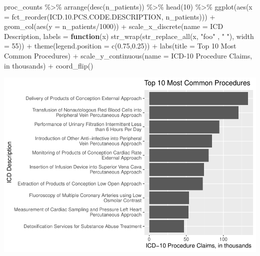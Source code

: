 \documentclass[preprint, 3p,
authoryear]{elsarticle} %
\newenvironment{Shaded}{\begin{snugshade}}{\end{snugshade}}
\newcommand{\AttributeTok}[1]{\textcolor[rgb]{0.77,0.63,0.00}{#1}}
\newcommand{\ControlFlowTok}[1]{\textcolor[rgb]{0.13,0.29,0.53}{\textbf{#1}}}
\newcommand{\DecValTok}[1]{\textcolor[rgb]{0.00,0.00,0.81}{#1}}
\newcommand{\FloatTok}[1]{\textcolor[rgb]{0.00,0.00,0.81}{#1}}
\newcommand{\FunctionTok}[1]{\textcolor[rgb]{0.00,0.00,0.00}{#1}}
\newcommand{\NormalTok}[1]{#1}
\newcommand{\SpecialCharTok}[1]{\textcolor[rgb]{0.00,0.00,0.00}{#1}}
\newcommand{\StringTok}[1]{\textcolor[rgb]{0.31,0.60,0.02}{#1}}
\begin{document}
\begin{Shaded}
\begin{Highlighting}[]
\NormalTok{proc\_counts }\SpecialCharTok{\%\textgreater{}\%}
  \FunctionTok{arrange}\NormalTok{(}\FunctionTok{desc}\NormalTok{(n\_patients)) }\SpecialCharTok{\%\textgreater{}\%}
  \FunctionTok{head}\NormalTok{(}\DecValTok{10}\NormalTok{) }\SpecialCharTok{\%\textgreater{}\%}
  \FunctionTok{ggplot}\NormalTok{(}\FunctionTok{aes}\NormalTok{(}\AttributeTok{x =} \FunctionTok{fct\_reorder}\NormalTok{(ICD.}\FloatTok{10.}\NormalTok{PCS.CODE.DESCRIPTION, n\_patients))) }\SpecialCharTok{+}
  \FunctionTok{geom\_col}\NormalTok{(}\FunctionTok{aes}\NormalTok{(}\AttributeTok{y =}\NormalTok{ n\_patients}\SpecialCharTok{/}\DecValTok{1000}\NormalTok{)) }\SpecialCharTok{+} 
  \FunctionTok{scale\_x\_discrete}\NormalTok{(}\AttributeTok{name =} \StringTok{\textquotesingle{}ICD Description\textquotesingle{}}\NormalTok{, }\AttributeTok{labels =} \ControlFlowTok{function}\NormalTok{(x) }\FunctionTok{str\_wrap}\NormalTok{(}\FunctionTok{str\_replace\_all}\NormalTok{(x, }\StringTok{"foo"}\NormalTok{ , }\StringTok{" "}\NormalTok{), }\AttributeTok{width =} \DecValTok{55}\NormalTok{)) }\SpecialCharTok{+}
  \FunctionTok{theme}\NormalTok{(}\AttributeTok{legend.position =} \FunctionTok{c}\NormalTok{(}\FloatTok{0.75}\NormalTok{,}\FloatTok{0.25}\NormalTok{)) }\SpecialCharTok{+}
  \FunctionTok{labs}\NormalTok{(}\AttributeTok{title =} \StringTok{\textquotesingle{}Top 10 Most Common Procedures\textquotesingle{}}\NormalTok{) }\SpecialCharTok{+}
  \FunctionTok{scale\_y\_continuous}\NormalTok{(}\AttributeTok{name =} \StringTok{\textquotesingle{}ICD{-}10 Procedure Claims, in thousands\textquotesingle{}}\NormalTok{) }\SpecialCharTok{+}
  \FunctionTok{coord\_flip}\NormalTok{() }
\end{Highlighting}
\end{Shaded}

\includegraphics{final-project-paper_files/figure-latex/top-10-procedures-1.pdf}
\end{document}

